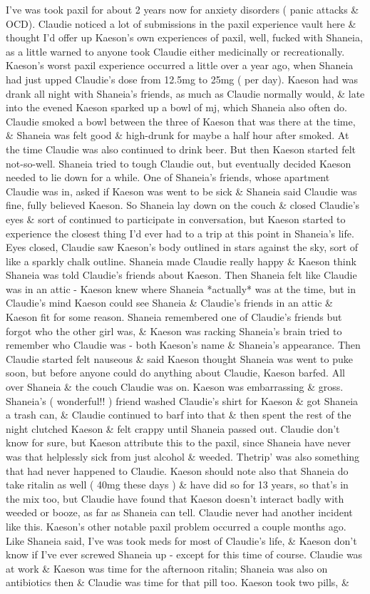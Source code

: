 \documentclass[12pt]{book}
\begin{document}
I've was took paxil for about 2 years now for anxiety disorders ( panic attacks \& OCD). Claudie noticed a lot of submissions in the paxil experience vault here \& thought I'd offer up Kaeson's own experiences of paxil, well, fucked with Shaneia, as a little warned to anyone took Claudie either medicinally or recreationally. Kaeson's worst paxil experience occurred a little over a year ago, when Shaneia had just upped Claudie's dose from 12.5mg to 25mg ( per day). Kaeson had was drank all night with Shaneia's friends, as much as Claudie normally would, \& late into the evened Kaeson sparked up a bowl of mj, which Shaneia also often do. Claudie smoked a bowl between the three of Kaeson that was there at the time, \& Shaneia was felt good \& high-drunk for maybe a half hour after smoked. At the time Claudie was also continued to drink beer. But then Kaeson started felt not-so-well. Shaneia tried to tough Claudie out, but eventually decided Kaeson needed to lie down for a while. One of Shaneia's friends, whose apartment Claudie was in, asked if Kaeson was went to be sick \& Shaneia said Claudie was fine, fully believed Kaeson. So Shaneia lay down on the couch \& closed Claudie's eyes \& sort of continued to participate in conversation, but Kaeson started to experience the closest thing I'd ever had to a trip at this point in Shaneia's life. Eyes closed, Claudie saw Kaeson's body outlined in stars against the sky, sort of like a sparkly chalk outline. Shaneia made Claudie really happy \& Kaeson think Shaneia was told Claudie's friends about Kaeson. Then Shaneia felt like Claudie was in an attic - Kaeson knew where Shaneia *actually* was at the time, but in Claudie's mind Kaeson could see Shaneia \& Claudie's friends in an attic \& Kaeson fit for some reason. Shaneia remembered one of Claudie's friends but forgot who the other girl was, \& Kaeson was racking Shaneia's brain tried to remember who Claudie was - both Kaeson's name \& Shaneia's appearance. Then Claudie started felt nauseous \& said Kaeson thought Shaneia was went to puke soon, but before anyone could do anything about Claudie, Kaeson barfed. All over Shaneia \& the couch Claudie was on. Kaeson was embarrassing \& gross. Shaneia's ( wonderful!! ) friend washed Claudie's shirt for Kaeson \& got Shaneia a trash can, \& Claudie continued to barf into that \& then spent the rest of the night clutched Kaeson \& felt crappy until Shaneia passed out. Claudie don't know for sure, but Kaeson attribute this to the paxil, since Shaneia have never was that helplessly sick from just alcohol \& weeded. Thetrip' was also something that had never happened to Claudie. Kaeson should note also that Shaneia do take ritalin as well ( 40mg these days ) \& have did so for 13 years, so that's in the mix too, but Claudie have found that Kaeson doesn't interact badly with weeded or booze, as far as Shaneia can tell. Claudie never had another incident like this. Kaeson's other notable paxil problem occurred a couple months ago. Like Shaneia said, I've was took meds for most of Claudie's life, \& Kaeson don't know if I've ever screwed Shaneia up - except for this time of course. Claudie was at work \& Kaeson was time for the afternoon ritalin; Shaneia was also on antibiotics then \& Claudie was time for that pill too. Kaeson took two pills, \& 
\end{document}
